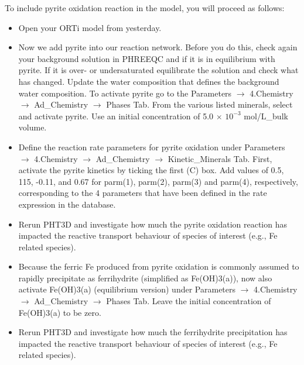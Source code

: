 To include pyrite oxidation reaction in the model, you will proceed as follows:


\begin{itemize}

\item Open your ORTi model from yesterday. 

\item Now we add pyrite into our reaction network. Before you do this, check 
again your background solution in PHREEQC and if it is in equilibrium with pyrite.
If it is over- or undersaturated equilibrate the solution and check what has changed.
Update the water composition that defines the background water composition.  
To activate pyrite go to the
{\color{blue}Parameters} $\rightarrow$ {\color{blue}4.Chemistry} $\rightarrow$ {\color{blue}Ad\_Chemistry} 
$\rightarrow$ {\color{blue}Phases} Tab. From the various listed minerals, select and activate pyrite. 
Use an initial concentration of 5.0 $\times$ $10^{-3}$ mol/L\_bulk volume.

\item Define the reaction rate parameters for pyrite oxidation under 
{\color{blue}Parameters} 
$\rightarrow$ {\color{blue}4.Chemistry} 
$\rightarrow$ {\color{blue}Ad\_Chemistry}
$\rightarrow$ {\color{blue}Kinetic\_Minerals} Tab. 
First, activate the pyrite kinetics by ticking the first {\color{blue}(C)} box. 
Add values of 0.5, 115, -0.11, and 0.67 for parm(1), parm(2), parm(3) and parm(4), respectively, 
corresponding to the 4 parameters that have been defined in the rate expression in the database.

\item Rerun PHT3D and investigate how much the pyrite oxidation reaction has impacted the reactive transport behaviour of species of interest (e.g., Fe related species).

\item Because the ferric Fe produced from pyrite oxidation is commonly assumed to rapidly precipitate as ferrihydrite (simplified as Fe(OH)3(a)), 
now also activate {\color{blue}Fe(OH)3(a)} (equilibrium version) under {\color{blue}Parameters} 
$\rightarrow$ {\color{blue}4.Chemistry} 
$\rightarrow$ {\color{blue}Ad\_Chemistry} 
$\rightarrow$ {\color{blue}Phases} Tab. 
Leave the initial concentration of Fe(OH)3(a) to be zero.

\item Rerun PHT3D and investigate how much the ferrihydrite precipitation has impacted the reactive transport behaviour of species of interest (e.g., Fe related species).  


\end{itemize}
